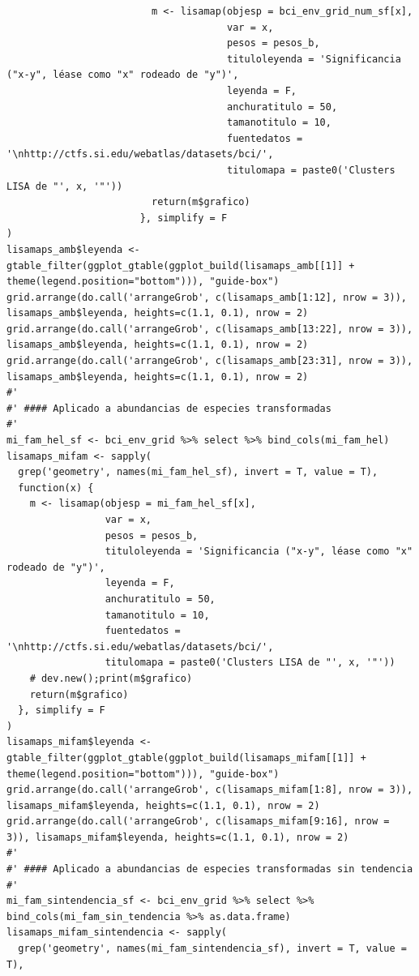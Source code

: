 \documentclass[11pt,]{article}
\begin{document}
\begin{verbatim}
                         m <- lisamap(objesp = bci_env_grid_num_sf[x],
                                      var = x,
                                      pesos = pesos_b,
                                      tituloleyenda = 'Significancia ("x-y", léase como "x" rodeado de "y")',
                                      leyenda = F,
                                      anchuratitulo = 50,
                                      tamanotitulo = 10,
                                      fuentedatos = '\nhttp://ctfs.si.edu/webatlas/datasets/bci/',
                                      titulomapa = paste0('Clusters LISA de "', x, '"'))
                         return(m$grafico)
                       }, simplify = F
)
lisamaps_amb$leyenda <- gtable_filter(ggplot_gtable(ggplot_build(lisamaps_amb[[1]] + theme(legend.position="bottom"))), "guide-box")
grid.arrange(do.call('arrangeGrob', c(lisamaps_amb[1:12], nrow = 3)), lisamaps_amb$leyenda, heights=c(1.1, 0.1), nrow = 2)
grid.arrange(do.call('arrangeGrob', c(lisamaps_amb[13:22], nrow = 3)), lisamaps_amb$leyenda, heights=c(1.1, 0.1), nrow = 2)
grid.arrange(do.call('arrangeGrob', c(lisamaps_amb[23:31], nrow = 3)), lisamaps_amb$leyenda, heights=c(1.1, 0.1), nrow = 2)
#' 
#' #### Aplicado a abundancias de especies transformadas
#' 
mi_fam_hel_sf <- bci_env_grid %>% select %>% bind_cols(mi_fam_hel)
lisamaps_mifam <- sapply(
  grep('geometry', names(mi_fam_hel_sf), invert = T, value = T),
  function(x) {
    m <- lisamap(objesp = mi_fam_hel_sf[x],
                 var = x,
                 pesos = pesos_b,
                 tituloleyenda = 'Significancia ("x-y", léase como "x" rodeado de "y")',
                 leyenda = F,
                 anchuratitulo = 50,
                 tamanotitulo = 10,
                 fuentedatos = '\nhttp://ctfs.si.edu/webatlas/datasets/bci/',
                 titulomapa = paste0('Clusters LISA de "', x, '"'))
    # dev.new();print(m$grafico)
    return(m$grafico)
  }, simplify = F
)
lisamaps_mifam$leyenda <- gtable_filter(ggplot_gtable(ggplot_build(lisamaps_mifam[[1]] + theme(legend.position="bottom"))), "guide-box")
grid.arrange(do.call('arrangeGrob', c(lisamaps_mifam[1:8], nrow = 3)), lisamaps_mifam$leyenda, heights=c(1.1, 0.1), nrow = 2)
grid.arrange(do.call('arrangeGrob', c(lisamaps_mifam[9:16], nrow = 3)), lisamaps_mifam$leyenda, heights=c(1.1, 0.1), nrow = 2)
#' 
#' #### Aplicado a abundancias de especies transformadas sin tendencia
#' 
mi_fam_sintendencia_sf <- bci_env_grid %>% select %>% bind_cols(mi_fam_sin_tendencia %>% as.data.frame)
lisamaps_mifam_sintendencia <- sapply(
  grep('geometry', names(mi_fam_sintendencia_sf), invert = T, value = T),

\end{verbatim}
\end{document}
